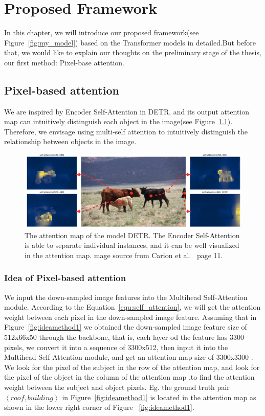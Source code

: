 \chapter{Proposed Framework}
\label{chap:framework}
In this chapter, we will introduce our proposed framework(see Figure~\ref{fig:my_model}) based on the Transformer models in detailed.But before that, we would like to explain our thoughts on the preliminary stage of the thesis, our first method: Pixel-base attention.


\section{Pixel-based attention}\label{sec:pixel_base}

We are inspired by Encoder Self-Attention in DETR, and its output attention map can intuitively distinguish each object in the image(see Figure~\ref{fig:detrattentionmap}). Therefore, we envisage using multi-self attention to intuitively distinguish the relationship between objects in the image.

\begin{figure}[!htbp]
	\centering
	\includegraphics[width=1\linewidth]{figures/detr_attention_map}
	\caption[The attention map of the model DETR]{The attention map of the model DETR. The Encoder Self-Attention is able to separate individual instances, and it can be well visualized in the attention map. mage source from Carion et al.~\cite{carion2020end} page 11.}
	\label{fig:detrattentionmap}
\end{figure}

\subsection{Idea of Pixel-based attention}

We input the down-sampled image features into the Multihead Self-Attention module. According to the Equation~\ref{equ:self_attention}, we will get the attention weight between each pixel in the down-sampled image feature. Assuming that in Figure~\ref{fig:ideamethod1} we obtained the down-sampled image feature size of 512x66x50 through the backbone, that is, each layer od the feature has 3300 pixels, we convert it into a sequence of 3300x512, then input it into the Multihead Self-Attention module, and get an attention map size of 3300x3300 . We look for the pixel of the subject in the row of the attention map, and look for the pixel of the object in the column of the attention map ,to find the attention weight between the subject and object pixels. Eg. the ground truth pair $ \left\langle roof, building \right \rangle $ in Figure~\ref{fig:ideamethod1} is located in the attention map as shown in the lower right corner of Figure ~\ref{fig:ideamethod1}.


